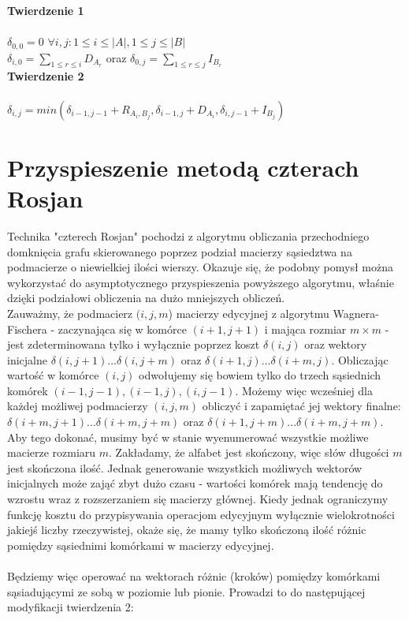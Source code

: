 \documentclass[12pt]{article}
\begin{document}
\noindent \textbf{Twierdzenie 1}\\\\
$\delta_{0,0} = 0$ $\forall i,j : 1 \leq i \leq |A|, 1 \leq j \leq |B|$\\
$\delta_{i,0} = \sum_{1 \leq r \leq i}D_A_r$ oraz
$\delta_{0,j} = \sum_{1 \leq r \leq j}I_B_r$\\

\noindent \textbf{Twierdzenie 2}\\\\
$\delta_{i, j} = min(\delta_{i-1,j-1}+R_{A_i,B_j}, \delta_{i-1,j}+D_A_i, \delta_{i,j-1}+I_B_j)$

\section{Przyspieszenie metodą czterach Rosjan}

Technika "czterech Rosjan" pochodzi z algorytmu obliczania przechodniego domknięcia grafu skierowanego poprzez podział macierzy sąsiedztwa na podmacierze o niewielkiej ilości wierszy. Okazuje się, że podobny pomysł można wykorzystać do asymptotycznego przyspieszenia powyższego algorytmu, właśnie dzięki podziałowi obliczenia na dużo mniejszych obliczeń.\\

\noindent Zauważmy, że podmacierz $(i,j,m$) macierzy edycyjnej z algorytmu Wagnera-Fischera - zaczynająca się w komórce $(i+1, j+1)$ i mająca rozmiar $m \times m$ - jest zdeterminowana tylko i wyłącznie poprzez koszt $\delta(i,j)$ oraz wektory inicjalne $\delta(i,j+1)...\delta(i,j+m)$ oraz $\delta(i+1,j)...\delta(i+m,j)$. Obliczając wartość w komórce $(i,j)$ odwołujemy się bowiem tylko do trzech sąsiednich komórek $(i-1,j-1), (i-1,j), (i, j-1)$. Możemy więc wcześniej dla każdej możliwej podmacierzy $(i,j,m)$ obliczyć i zapamiętać jej wektory finalne: $\delta(i+m,j+1)...\delta(i+m,j+m)$ oraz $\delta(i+1,j+m)...\delta(i+m,j+m)$.\\

\noindent Aby tego dokonać, musimy być w stanie wyenumerować wszystkie możliwe macierze rozmiaru $m$. Zakładamy, że alfabet jest skończony, więc słów długości $m$ jest skończona ilość. Jednak generowanie wszystkich możliwych wektorów inicjalnych może zająć zbyt dużo czasu - wartości komórek mają tendencję do wzrostu wraz z rozszerzaniem się macierzy głównej. Kiedy jednak ograniczymy funkcję kosztu do przypisywania operacjom edycyjnym wyłącznie wielokrotności jakiejś liczby rzeczywistej, okaże się, że mamy tylko skończoną ilość różnic pomiędzy sąsiednimi komórkami w macierzy edycyjnej.\\\\
Będziemy więc operować na wektorach różnic (kroków) pomiędzy komórkami sąsiadującymi ze sobą w poziomie lub pionie. Prowadzi to do następującej modyfikacji twierdzenia 2:\\
\end{document}
